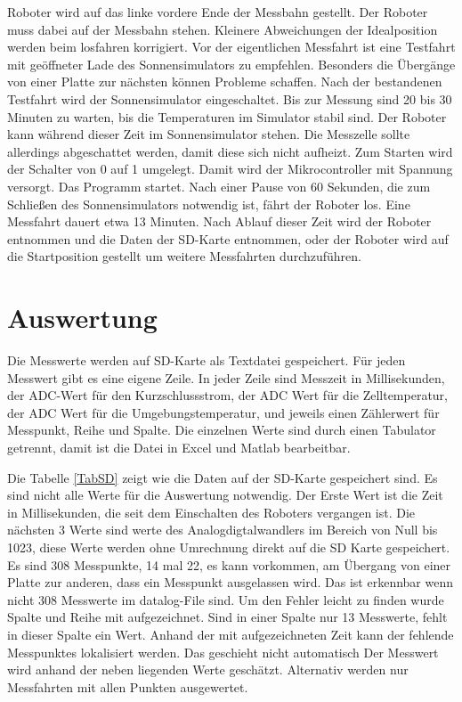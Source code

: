 \documentclass[a4paper,bibtotoc,oneside]{scrbook}
\begin{document}
Roboter wird auf das linke vordere Ende der Messbahn gestellt. Der Roboter muss dabei auf der Messbahn stehen. Kleinere Abweichungen der Idealposition werden beim losfahren korrigiert. 
Vor der eigentlichen Messfahrt ist eine Testfahrt mit geöffneter Lade des Sonnensimulators zu empfehlen. Besonders die Übergänge von einer Platte zur nächsten können Probleme schaffen.
Nach der bestandenen Testfahrt wird der Sonnensimulator eingeschaltet. Bis zur Messung sind 20 bis 30 Minuten zu warten, bis die Temperaturen im Simulator stabil sind. Der Roboter kann während dieser Zeit im Sonnensimulator stehen. Die Messzelle sollte allerdings abgeschattet werden, damit diese sich nicht aufheizt. 
Zum Starten wird der Schalter von 0 auf 1 umgelegt. Damit wird der Mikrocontroller mit Spannung versorgt. Das Programm startet. Nach einer Pause von 60 Sekunden, die zum Schließen des Sonnensimulators notwendig ist, fährt der Roboter los. Eine Messfahrt dauert etwa 13 Minuten. Nach Ablauf dieser Zeit wird der Roboter entnommen und die Daten der SD-Karte entnommen, oder der Roboter wird auf die Startposition gestellt um weitere Messfahrten durchzuführen.


\section{Auswertung}\thispagestyle{empty}


Die Messwerte werden auf SD-Karte als Textdatei gespeichert. Für jeden Messwert gibt es eine eigene Zeile. In jeder Zeile sind Messzeit in Millisekunden, der ADC-Wert für den Kurzschlussstrom, der ADC Wert für die Zelltemperatur, der ADC Wert für die Umgebungstemperatur, und jeweils einen Zählerwert für Messpunkt, Reihe und Spalte. Die einzelnen Werte sind durch einen Tabulator getrennt, damit ist die Datei in Excel und Matlab bearbeitbar.  

Die Tabelle \ref{TabSD} zeigt wie die Daten auf der SD-Karte gespeichert sind. Es sind nicht alle Werte für die Auswertung notwendig. Der Erste Wert ist die Zeit in Millisekunden, die seit dem Einschalten des Roboters vergangen ist. Die nächsten 3 Werte sind werte des Analogdigtalwandlers im Bereich von Null bis 1023, diese Werte werden ohne Umrechnung direkt auf die SD Karte gespeichert. Es sind 308 Messpunkte, 14 mal 22, es kann vorkommen, am Übergang von einer Platte zur anderen, dass ein Messpunkt ausgelassen wird. Das ist erkennbar wenn nicht 308 Messwerte im datalog-File sind. Um den Fehler leicht zu finden wurde Spalte und Reihe mit aufgezeichnet. Sind in einer Spalte nur 13 Messwerte, fehlt in dieser Spalte ein Wert. Anhand der mit aufgezeichneten Zeit kann der fehlende Messpunktes lokalisiert werden. Das geschieht nicht automatisch Der Messwert wird anhand der neben liegenden Werte geschätzt. Alternativ werden nur Messfahrten mit allen Punkten ausgewertet.
 
\end{document}
